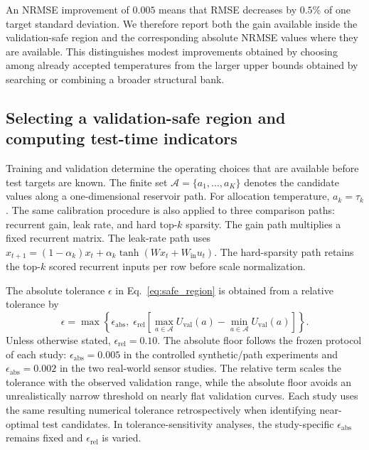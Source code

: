 \documentclass[preprint,12pt,authoryear]{elsarticle}
\begin{document}
An NRMSE improvement of $0.005$ means that RMSE decreases by $0.5\%$ of one target standard deviation. We therefore report both the gain available inside the validation-safe region and the corresponding absolute NRMSE values where they are available. This distinguishes modest improvements obtained by choosing among already accepted temperatures from the larger upper bounds obtained by searching or combining a broader structural bank.

\subsection{Selecting a validation-safe region and computing test-time indicators}
\label{sec:safe_region_methods}

Training and validation determine the operating choices that are available before test targets are known. The finite set $\mathcal A=\{a_1,\ldots,a_K\}$ denotes the candidate values along a one-dimensional reservoir path. For allocation temperature, $a_k=\tau_k$. The same calibration procedure is also applied to three comparison paths: recurrent gain, leak rate, and hard top-$k$ sparsity. The gain path multiplies a fixed recurrent matrix. The leak-rate path uses $x_{t+1}=(1-\alpha_k)x_t+\alpha_k\tanh(Wx_t+W_{\mathrm{in}}u_t)$. The hard-sparsity path retains the top-$k$ scored recurrent inputs per row before scale normalization.

The absolute tolerance $\epsilon$ in Eq.~\eqref{eq:safe_region} is obtained from a relative tolerance by
\begin{equation}
  \epsilon = \max\!\left\{\epsilon_{\mathrm{abs}},\;\epsilon_{\mathrm{rel}}\left[\max_{a\in\mathcal A}U_{\mathrm{val}}(a)-\min_{a\in\mathcal A}U_{\mathrm{val}}(a)\right]\right\}.
  \label{eq:tolerance_rule}
\end{equation}
Unless otherwise stated, $\epsilon_{\mathrm{rel}}=0.10$. The absolute floor follows the frozen protocol of each study: $\epsilon_{\mathrm{abs}}=0.005$ in the controlled synthetic/path experiments and $\epsilon_{\mathrm{abs}}=0.002$ in the two real-world sensor studies. The relative term scales the tolerance with the observed validation range, while the absolute floor avoids an unrealistically narrow threshold on nearly flat validation curves. Each study uses the same resulting numerical tolerance retrospectively when identifying near-optimal test candidates. In tolerance-sensitivity analyses, the study-specific $\epsilon_{\mathrm{abs}}$ remains fixed and $\epsilon_{\mathrm{rel}}$ is varied.
\end{document}
